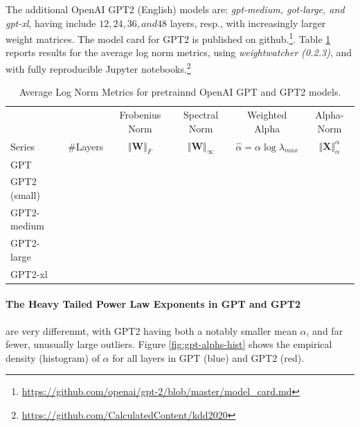 The additional OpenAI GPT2 (English) models are: \emph{gpt-medium, got-large, and gpt-xl}, 
having include $12, 24, 36, and 48$ layers, resp., with increasingly larger weight matrices.
The model card for GPT2 is published on github.\footnote{\url{https://github.com/openai/gpt-2/blob/master/model_card.md}}.
Table \ref{table:nlp} reports results for the average log norm metrics, using \emph{weightwatcher (0.2.3)},
and with fully reproducible Jupyter notebooks.\footnote{\url{https://github.com/CalculatedContent/kdd2020}}


\begin{table}[t]
\small
\begin{center}
\begin{tabular}{|p{1in}|c|c|c|c|c|}
\hline
   &    & Frobenius Norm & Spectral Norm & Weighted Alpha & Alpha-Norm \\
 Series & \#Layers   & $\Vert\mathbf{W}\Vert_{F}$ & $\Vert\mathbf{W}\Vert_{\infty}$ & $\hat{\alpha}=\alpha\log\lambda_{max}$ & $\Vert\mathbf{X}\Vert^{\alpha}_{\alpha}$ \\
\hline
 GPT & & & & &\\
 GPT2 (small) & & & & & \\
 GPT2-medium & & & & & \\
 GPT2-large & & & & & \\
 GPT2-xl & & & & &\\

\hline
\end{tabular}
\end{center}
\caption{Average Log Norm Metrics for pretrainnd OpenAI GPT and GPT2 models.}
\label{table:nlp}
\end{table}


\paragraph{The Heavy Tailed Power Law Exponents in GPT and GPT2}

are very differenmt, with GPT2 having both a notably smaller mean $\alpha$, and far fewer, unusually large outliers.
Figure \ref{fig:gpt-alphs-hist} shows the empirical density (histogram) of $\alpha$
for all layers in GPT (blue) and GPT2 (red).  

